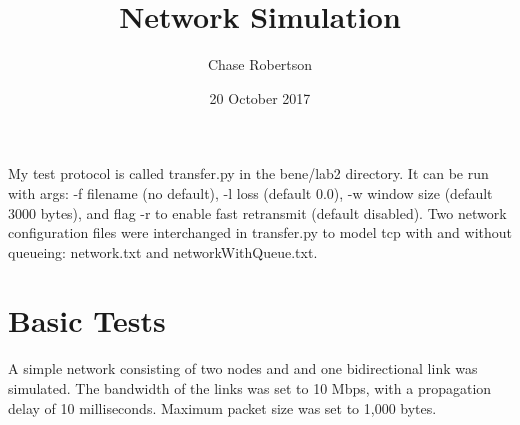 \documentclass[fleqn,11pt]{article}
\begin{document}
\title{Network Simulation}

\author{Chase Robertson}

\date{20 October 2017}

\maketitle

My test protocol is called transfer.py in the bene/lab2 directory. It can be run with args: -f filename (no default), -l loss (default 0.0), -w window size (default 3000 bytes), and flag -r to enable fast retransmit (default disabled). Two network configuration files were interchanged in transfer.py to model tcp with and without queueing: network.txt and networkWithQueue.txt.

\section{Basic Tests}

A simple network consisting of two nodes and and one bidirectional link was simulated. The bandwidth of the links was set to 10 Mbps, with a propagation delay of 10 milliseconds. Maximum packet size was set to 1,000 bytes.
\end{document}
